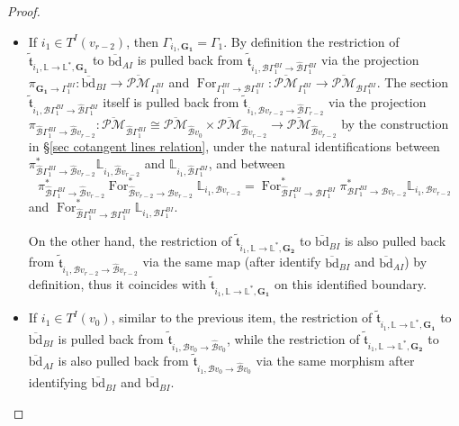 \documentclass[11pt]{amsart}
\theoremstyle{definition}
\theoremstyle{remark}
\newcommand{\oPMb}{{\overline{\mathcal{PM}}}}
\newcommand{\<}{\left<}
\renewcommand{\>}{\right>}
\numberwithin{equation}{section}
\begin{document}
\begin{proof}
\begin{itemize}
        \item[-] If $i_1\in T^I(v_{r-2})$, then $\Gamma_{i_1,\mathbf{G_1}}=\Gamma_1$. By definition the restriction of $\tilde{\mathfrak{t}}_{i_1,\mathbb L \to \mathbb L^*,\mathbf{G_1}}$ to $\overline{\text{bd}}_{AI}$ is pulled back from 
        $\tilde{\mathfrak t}_{i_1,{\mathcal B}\Gamma_{1}^{BI}\to\hat{\mathcal B}\Gamma_{1}^{BI}}$ 
        via the projection $\pi_{\mathbf{G_1}\to \Gamma_1^{BI}}\colon \overline{\text{bd}}_{BI}\to \oPMb_{\Gamma_1^{BI}}$ and $\operatorname{For}_{\Gamma_{1}^{BI}\to \mathcal{B}\Gamma_{1}^{BI}}\colon \oPMb_{\Gamma_{1}^{BI}}\to \oPMb_{\mathcal{B}\Gamma_{1}^{BI}}$. The section 
        $\tilde{\mathfrak t}_{i_1,{\mathcal B}\Gamma_{1}^{BI}\to\hat{\mathcal B}\Gamma_{1}^{BI}}$ 
        itself is pulled back from $\tilde{\mathfrak t}_{i_1,{\mathcal B}v_{r-2}\to\hat{\mathcal B}\Gamma_{r-2}}$ via the projection $\pi_{\hat{\mathcal B}\Gamma_1^{BI}\to \hat{\mathcal B}v_{r-2}}\colon\oPMb_{\hat{\mathcal B}\Gamma_1^{BI}}\cong \oPMb_{\hat{\mathcal B}v_0}\times \oPMb_{\hat{\mathcal B}v_{r-2}}\to \oPMb_{\hat{\mathcal B}v_{r-2}}$ by the construction in \S \ref{sec cotangent lines relation}, under the natural identifications between $\pi^*_{\hat{\mathcal B} \Gamma_{1}^{BI}\to \hat{\mathcal B} v_{r-2}}\mathbb L_{i_1,\hat{\mathcal B} v_{r-2}}$ and $\mathbb L_{i_1,\hat{\mathcal B} \Gamma_{1}^{BI}}$, and between $$ \pi^*_{\hat{\mathcal B} \Gamma_{1}^{BI}\to \hat{\mathcal B} v_{r-2}} \operatorname{For}^*_{\hat{\mathcal B} v_{r-2} \to \mathcal B v_{r-2}} \mathbb L_{i_1,\mathcal B v_{r-2}}=\operatorname{For}^*_{\hat{\mathcal B} \Gamma_{1}^{BI} \to \mathcal B \Gamma_{1}^{BI}} \pi^*_{\mathcal B \Gamma_{1}^{BI}\to \mathcal B v_{r-2}}\mathbb L_{i_1,\mathcal B v_{r-2}}$$ and $\operatorname{For}^*_{\hat{\mathcal B} \Gamma_{1}^{BI} \to \mathcal B \Gamma_{1}^{BI}} \mathbb L_{i_1,\mathcal B \Gamma_{1}^{BI}}$. 

          On the other hand, the restriction of  $\tilde{\mathfrak{t}}_{i_1,\mathbb L \to \mathbb L^*,\mathbf{G_2}}$ to $\overline{\text{bd}}_{BI}$ is also pulled back from $\tilde{\mathfrak t}_{i_1,{\mathcal B}v_{r-2}\to\hat{\mathcal B}v_{r-2}}$ via the same map (after identify $\overline{\text{bd}}_{BI}$ and $\overline{\text{bd}}_{AI}$) by definition, thus it coincides with $\tilde{\mathfrak{t}}_{i_1,\mathbb L \to \mathbb L^*,\mathbf{G_1}}$ on this identified boundary.
          
        
      

        \item[-] If $i_1\in T^I(v_{0})$, similar to the previous item, the restriction of $\tilde{\mathfrak{t}}_{i_1,\mathbb L \to \mathbb L^*,\mathbf{G_1}}$ to $\overline{\text{bd}}_{BI}$ is pulled back from  $\tilde{\mathfrak t}_{i_1,{\mathcal B}v_{0}\to\hat{\mathcal B}v_{0}}$, 
         while the restriction of $\tilde{\mathfrak{t}}_{i_1,\mathbb L \to \mathbb L^*,\mathbf{G_2}}$ to $\overline{\text{bd}}_{AI}$  is also pulled back 
         from $\tilde{\mathfrak t}_{i_1,{\mathcal B}v_0\to\hat{\mathcal B}v_0}$ via the same morphism after identifying $\overline{\text{bd}}_{BI}$ and $\overline{\text{bd}}_{BI}$.


\end{itemize}
\end{proof}
\end{document}
